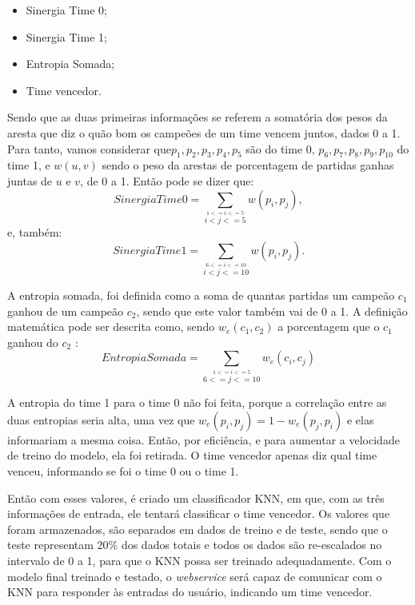\begin{itemize}
	\item Sinergia Time 0;
	\item Sinergia Time 1;
	\item Entropia Somada;
	\item Time vencedor.
\end{itemize}

Sendo que as duas primeiras informações se referem a somatória dos pesos da aresta que diz o quão bom os campeões de um time vencem juntos, dados 0 a 1. Para tanto, vamos considerar que\( p_1, p_2, p_3, p_4, p_5 \) são do time 0, \( p_6, p_7, p_8, p_9, p_10 \) do time 1, e \(w(u,v)\) sendo o peso da arestas de porcentagem de partidas ganhas juntas de \(u\) e \(v\), de 0 a 1. Então pode se dizer que: \[ Sinergia Time 0 = \sum_{\overset{1<=i<=5}{i<j<=5}}w(p_i,p_j),\] e, também: \[ Sinergia Time 1 = \sum_{\overset{6<=i<=10}{i<j<=10}}w(p_i,p_j).\]

A entropia somada, foi definida como a soma de quantas partidas um campeão \(c_1\) ganhou de um campeão \(c_2\), sendo que este valor também vai de 0 a 1. A definição matemática pode ser descrita como, sendo \(w_e(c_1,c_2)\) a porcentagem que o \(c_1\) ganhou do \(c_2\) : \[ Entropia Somada = \sum_{\overset{1<=i<=5}{6<=j<=10}}w_e(c_i,c_j)\]

A entropia do time 1 para o time 0 não foi feita, porque a correlação entre as duas entropias seria alta, uma vez que \(w_e(p_i, p_j) = 1 - w_e(p_j, p_i)\) e elas informariam a mesma coisa. Então, por eficiência, e para aumentar a velocidade de treino do modelo, ela foi retirada. O time vencedor apenas diz qual time venceu, informando se foi o time 0 ou o time 1.

Então com esses valores, é criado um classificador KNN, em que, com as três informações de entrada, ele tentará classificar o time vencedor. Os valores que foram armazenados, são separados em dados de treino e de teste, sendo que o teste representam 20\% dos dados totais e todos os dados são re-escalados no intervalo de 0 a 1, para que o KNN possa ser treinado adequadamente.
Com o modelo final treinado e testado, o \textit{webservice} será capaz de comunicar com o KNN para responder às entradas do usuário, indicando um time vencedor.
\